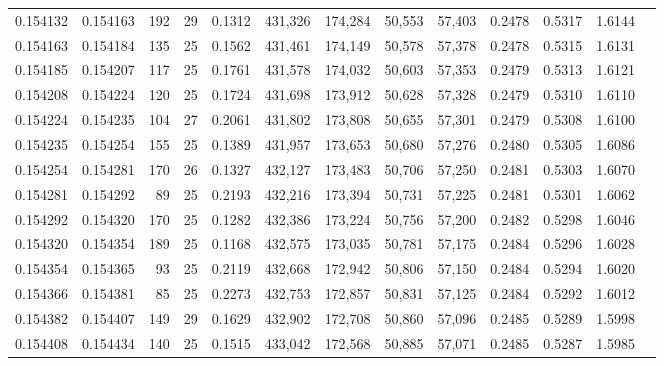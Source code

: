 \begin{tabular}{rrrrrrrrrrrrr}
0.154132 & 0.154163 & 192 &  29 &                                     0.1312 & 431,326 & 174,284 &  50,553 &  57,403 & 0.2478 & 0.5317 & 1.6144 \\
0.154163 & 0.154184 & 135 &  25 &                                     0.1562 & 431,461 & 174,149 &  50,578 &  57,378 & 0.2478 & 0.5315 & 1.6131 \\
0.154185 & 0.154207 & 117 &  25 &                                     0.1761 & 431,578 & 174,032 &  50,603 &  57,353 & 0.2479 & 0.5313 & 1.6121 \\
0.154208 & 0.154224 & 120 &  25 &                                     0.1724 & 431,698 & 173,912 &  50,628 &  57,328 & 0.2479 & 0.5310 & 1.6110 \\
0.154224 & 0.154235 & 104 &  27 &                                     0.2061 & 431,802 & 173,808 &  50,655 &  57,301 & 0.2479 & 0.5308 & 1.6100 \\
0.154235 & 0.154254 & 155 &  25 &                                     0.1389 & 431,957 & 173,653 &  50,680 &  57,276 & 0.2480 & 0.5305 & 1.6086 \\
0.154254 & 0.154281 & 170 &  26 &                                     0.1327 & 432,127 & 173,483 &  50,706 &  57,250 & 0.2481 & 0.5303 & 1.6070 \\
0.154281 & 0.154292 &  89 &  25 &                                     0.2193 & 432,216 & 173,394 &  50,731 &  57,225 & 0.2481 & 0.5301 & 1.6062 \\
0.154292 & 0.154320 & 170 &  25 &                                     0.1282 & 432,386 & 173,224 &  50,756 &  57,200 & 0.2482 & 0.5298 & 1.6046 \\
0.154320 & 0.154354 & 189 &  25 &                                     0.1168 & 432,575 & 173,035 &  50,781 &  57,175 & 0.2484 & 0.5296 & 1.6028 \\
0.154354 & 0.154365 &  93 &  25 &                                     0.2119 & 432,668 & 172,942 &  50,806 &  57,150 & 0.2484 & 0.5294 & 1.6020 \\
0.154366 & 0.154381 &  85 &  25 &                                     0.2273 & 432,753 & 172,857 &  50,831 &  57,125 & 0.2484 & 0.5292 & 1.6012 \\
0.154382 & 0.154407 & 149 &  29 &                                     0.1629 & 432,902 & 172,708 &  50,860 &  57,096 & 0.2485 & 0.5289 & 1.5998 \\
0.154408 & 0.154434 & 140 &  25 &                                     0.1515 & 433,042 & 172,568 &  50,885 &  57,071 & 0.2485 & 0.5287 & 1.5985 \\

\end{tabular}
